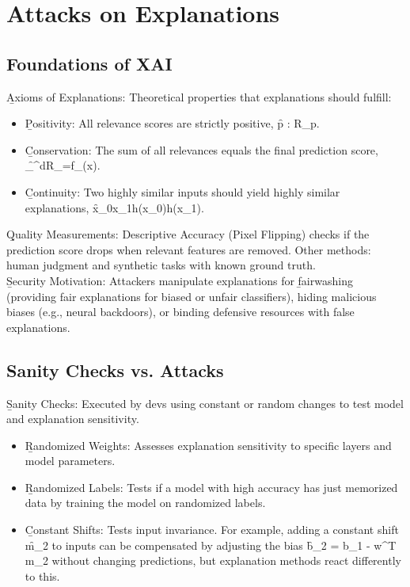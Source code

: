\section{Attacks on Explanations}

\subsection{Foundations of XAI}
\vspace{1em}
\b{Axioms of Explanations}: Theoretical properties that explanations should fulfill:
\begin{itemize}
\item \b{Positivity}: All relevance scores are strictly positive, \f{\forall p : R_{p}}.
\item \b{Conservation}: The sum of all relevances equals the final prediction score, \f{\sum_{}^{d}R_{\rho}=f_{\theta}(x)}.
\item \b{Continuity}: Two highly similar inputs should yield highly similar explanations, \f{x_{0}\approx x_{1}\rightarrow h(x_{0})\approx h(x_{1})}.
\end{itemize}
\vspace{.5em}
\b{Quality Measurements}: Descriptive Accuracy (Pixel Flipping) checks if the prediction score drops when relevant features are removed. Other methods: human judgment and synthetic tasks with known ground truth.\\[1em]
\b{Security Motivation}: Attackers manipulate explanations for \b{fairwashing} (providing fair explanations for biased or unfair classifiers), hiding malicious biases (e.g., neural backdoors), or binding defensive resources with false explanations.



\subsection{Sanity Checks vs. Attacks}
\b{Sanity Checks}: Executed by devs using constant or random changes to test model and explanation sensitivity.
\begin{itemize}
\item \b{Randomized Weights}: Assesses explanation sensitivity to specific layers and model parameters.
\item \b{Randomized Labels}: Tests if a model with high accuracy has just memorized data by training the model on randomized labels.
\item \b{Constant Shifts}: Tests input invariance. For example, adding a constant shift \f{m_2} to inputs can be compensated by adjusting the bias \f{b_2 = b_1 - w^T m_2} without changing predictions, but explanation methods react differently to this.
\end{itemize}
\vspace{.5em}

